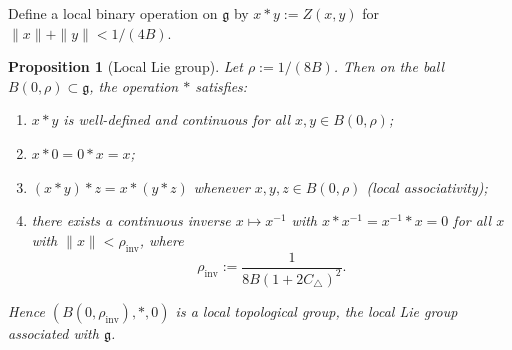 \documentclass[10pt]{amsart}
\newtheorem{proposition}[theorem]{Proposition}
\theoremstyle{definition}
\theoremstyle{remark}
\numberwithin{equation}{section}
\newcommand{\Ctri}{C_{\triangle}}    %
\newcommand{\Cbracket}{B}            %
\begin{document}
Define a local binary operation on $\mathfrak{g}$ by $x*y := Z(x,y)$ for
$\|x\|+\|y\|<1/(4\Cbracket)$.

\begin{proposition}[Local Lie group]\label{prop:localgroup}
Let $\rho := 1/(8\Cbracket)$.  Then on the ball $B(0,\rho)\subset\mathfrak{g}$, the
operation $*$ satisfies:
\begin{enumerate}[label=(\roman*)]
    \item $x*y$ is well-defined and continuous for all $x,y\in B(0,\rho)$;
    \item $x*0 = 0*x = x$;
    \item $(x*y)*z = x*(y*z)$ whenever $x,y,z\in B(0,\rho)$ (local associativity);
    \item there exists a continuous inverse $x\mapsto x^{-1}$ with
          $x*x^{-1}=x^{-1}*x=0$ for all $x$ with $\|x\| <
          \rho_{\mathrm{inv}}$, where
          \[
            \rho_{\mathrm{inv}} := \frac{1}{8\Cbracket(1+2\Ctri)^2}.
          \]
\end{enumerate}
Hence $(B(0,\rho_{\mathrm{inv}}),*,0)$ is a local topological group, the \emph{local
Lie group associated with $\mathfrak{g}$}.
\end{proposition}
\end{document}
